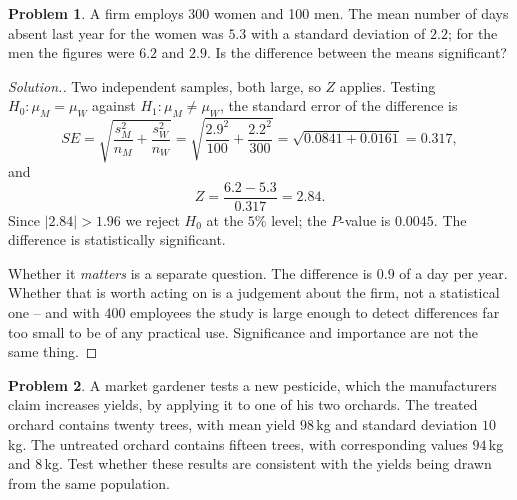 \documentclass[11pt,a4paper]{article}
\theoremstyle{definition}
\newtheorem{problemx}{Problem}[section]
\newenvironment{problem}{\begin{problemx}}{\end{problemx}}
\newenvironment{solution}
  {\renewcommand{\qedsymbol}{}\begin{proof}[\textit{Solution}.]}
  {\end{proof}}
\begin{document}
\begin{problem}
A firm employs 300 women and 100 men. The mean number of days absent last year for the women
was $5.3$ with a standard deviation of $2.2$; for the men the figures were $6.2$ and $2.9$.
Is the difference between the means significant?
\end{problem}

\begin{solution}
Two independent samples, both large, so $Z$ applies. Testing
$H_0:\mu_M=\mu_W$ against $H_1:\mu_M\neq\mu_W$, the standard error of the difference is
\[SE=\sqrt{\frac{s_M^2}{n_M}+\frac{s_W^2}{n_W}}
=\sqrt{\frac{2.9^2}{100}+\frac{2.2^2}{300}}=\sqrt{0.0841+0.0161}=0.317,\]
and
\[Z=\frac{6.2-5.3}{0.317}=2.84.\]
Since $|2.84|>1.96$ we reject $H_0$ at the $5\%$ level; the $P$-value is $0.0045$. The
difference is statistically significant.

\medskip
Whether it \emph{matters} is a separate question. The difference is $0.9$ of a day per year.
Whether that is worth acting on is a judgement about the firm, not a statistical one -- and
with 400 employees the study is large enough to detect differences far too small to be of
any practical use. Significance and importance are not the same thing.
\end{solution}

\begin{problem}
A market gardener tests a new pesticide, which the manufacturers claim increases yields, by
applying it to one of his two orchards. The treated orchard contains twenty trees, with mean
yield $98$\,kg and standard deviation $10$\,kg. The untreated orchard contains fifteen trees,
with corresponding values $94$\,kg and $8$\,kg. Test whether these results are consistent
with the yields being drawn from the same population.
\end{problem}
\end{document}
